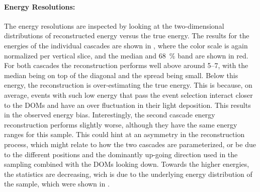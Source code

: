 \paragraph{Energy Resolutions:}

The energy resolutions are inspected by looking at the two-dimensional distributions of reconstructed energy versus the true energy. The results for the energies of the individual cascades are shown in , where the color scale is again normalized per vertical slice, and the median and \SI{68}{\percent} band are shown in red. For both cascades the reconstruction performs well above around \SIrange{5}{7}{\gev}, with the median being on top of the diagonal and the spread being small. Below this energy, the reconstruction is over-estimating the true energy. This is because, on average, events with such low energy that pass the event selection interact closer to the DOMs and have an over fluctuation in their light deposition. This results in the observed energy bias. Interestingly, the second cascade energy reconstruction performs slightly worse, although they have the same energy ranges for this sample. This could hint at an asymmetry in the reconstruction process, which might relate to how the two cascades are parameterized, or be due to the different positions and the dominantly up-going direction used in the sampling combined with the DOMs looking down. Towards the higher energies, the statistics are decreasing, wich is due to the underlying energy distribution of the sample, which were shown in .


